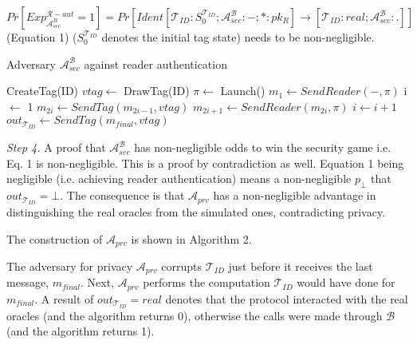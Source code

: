     $Pr[Exp_{\mathcal{A}_{sec}^{B}}^{\mathcal{R}-aut} = 1] = Pr[Ident[\mathcal{T}_{ID}:S_0^{\mathcal{T}_{ID}}; \mathcal{A}_{sec}^{\mathcal{B}}:-; *:pk_{R}]
    \rightarrow [\mathcal{T}_{ID}:real; \mathcal{A}_{sec}^{\mathcal{B}}:.]]$ (Equation 1) ($S_0^{\mathcal{T}_{ID}}$ denotes the initial tag state) needs to be
    non-negligible.
    

    \begin{algorithm}[H] %
        \centering
        \caption{Adversary $\mathcal{A}_{sec}^{\mathcal{B}}$ against reader authentication}
        \begin{algorithmic}[1] %
            \State CreateTag(ID)
            \State $vtag \leftarrow$ DrawTag(ID)
            \State $\pi \leftarrow$ Launch() 
            \State $m_1 \leftarrow SendReader(-,\pi)$ 
            \State i $\leftarrow$ 1
                \State $m_{2i} \gets SendTag(m_{2i-1}, vtag)$ 
                \State $m_{2i+1} \gets SendReader(m_{2i}, \pi)$ 
                \State $i \gets i+1$
            \EndWhile
            \State $out_{\mathcal{T}_{ID}} \gets SendTag(m_{final}, vtag)$ 
        \end{algorithmic}
    \end{algorithm}

    
    \textit{Step 4.} A proof that $\mathcal{A}_{sec}^{\mathcal{B}}$ has non-negligible odds to win the security game i.e. Eq. 1 is non-negligible.
    This is a proof by contradiction as well. Equation 1 being negligible (i.e. achieving reader authentication) means a non-negligible $p_{\bot}$ that $out_{\mathcal{T}_{ID}} = \bot$.
    The consequence is that $\mathcal{A}_{prv}$ has a non-negligible advantage in distinguishing the real oracles from the simulated ones, contradicting privacy.

    The construction of $\mathcal{A}_{prv}$ is shown in Algorithm 2.

    The adversary for privacy $\mathcal{A}_{prv}$ corrupts $\mathcal{T}_{ID}$ just before it receives the last message, $m_{final}$. Next, $\mathcal{A}_{prv}$
    performs the computation $\mathcal{T}_{ID}$ would have done for $m_{final}$. A result of $out_{\mathcal{T}_{ID}} = real$ denotes that the protocol interacted
    with the real oracles (and the algorithm returns 0), otherwise the calls were made through $\mathcal{B}$ (and the algorithm returns 1).

